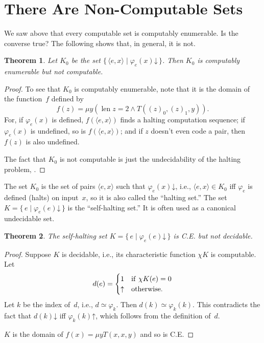 \documentclass[10pt,a4paper]{article}
\makeatletter
\newcommand*{\olup}[1]{\MakeUppercase{#1}}
\theoremstyle{plain}
\newtheorem{thm}{Theorem}[section]
\theoremstyle{definition}
\theoremstyle{remark}
\newcommand*{\olfileid}[3]{}
\newcommand*{\olsection}[1]{\section*{#1}}
\newcommand*{\ollabel}[1]{\label{#1}}
\newcommand{\olref}{\@ifnextchar[{\olref@i}{\olref@final}}
\def\olref@i[#1]{\@ifnextchar[{\olref@ii}{\olref@final}}
\def\olref@ii[#1]{\@ifnextchar[{\olref@iii}{\olref@final}}
\def\olref@iii[#1]{\olref@final}
\def\olref@final#1{\ref{#1}}
\providecommand{\tuple}[1]{\langle #1 \rangle}
\providecommand{\cfind}[1]{\varphi_{#1}}
\providecommand{\fdefined}{\mathord{\downarrow}}
\providecommand{\len}{\operatorname{len}}
\providecommand{\Setabs}[2]{\{\, #1 \mid #2 \,\}}
\providecommand{\Char}{\chi}
\providecommand{\umin}{\mu}
\providecommand{\fundefined}{\mathord{\uparrow}}
\makeatother
\begin{document}
\olfileid{cmp}{thy}{ncp}
\olsection{There Are Non-Computable Sets}


We saw above that every computable set is computably enumerable. Is
the converse true? The following shows that, in general, it is not.

\begin{thm}\ollabel{thm:K-0}
Let $K_0$ be the set $\Setabs{\tuple{e, x}}{\cfind{e}(x) \fdefined}$.
Then $K_0$ is computably enumerable but not computable.
\end{thm}

\begin{proof}
To see that $K_0$ is computably enumerable, note that it is the
domain of the function~$f$ defined by
\[
f(z) = \umin{y}{(\len{z} = 2 \land T((z)_0, (z)_1, y))}.
\]
For, if $\cfind{e}(x)$ is defined, $f(\tuple{e, x})$ finds a halting
computation sequence; if $\cfind{e}(x)$ is undefined, so is
$f(\tuple{e, x})$; and if $z$ doesn't even code a pair, then $f(z)$ is
also undefined.

The fact that $K_0$ is not computable is just the undecidability of
the halting problem, \olref[hlt]{thm:halting-problem}.
\end{proof}

The set $K_0$ is the set of pairs $\tuple{e,x}$ such that
$\cfind{e}(x) \fdefined$, i.e., $\tuple{e,x} \in K_0$ iff $\cfind{e}$
is defined (halts) on input~$x$, so it is also called the ``halting
set.'' The set $K = \Setabs{e}{\cfind{e}(e) \fdefined}$ is the
``self-halting set.'' It is often used as a canonical undecidable set.

\begin{thm}\ollabel{thm:K}
The self-halting set $K = \Setabs{e}{\cfind{e}(e) \fdefined}$ is
\olup{c.e.} but not decidable.
\end{thm}

\begin{proof}
  Suppose $K$ is decidable, i.e., its characteristic function
  $\Char{K}$ is computable. Let 
  \[d(e) = \begin{cases}
  1 & \text{if\/ $\Char{K}(e) = 0$}\\
  \fundefined & \text{otherwise.}
  \end{cases}
  \] 
  Let $k$ be the index of~$d$, i.e., $d \simeq \cfind{k}$. Then $d(k)
  \simeq \cfind{k}(k)$. This contradicts the fact that $d(k)
  \fdefined$ iff $\cfind{k}(k) \fundefined$, which follows from the
  definition of~$d$.

  $K$ is the domain of $f(x) = \umin{y}{T(x,x,y)}$ and so is \olup{c.e.}
\end{proof}
\end{document}

